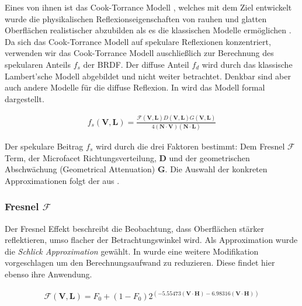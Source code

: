 Eines von ihnen ist das Cook-Torrance Modell \parencite{Cook1981}, welches mit dem Ziel entwickelt wurde die physikalischen Reflexionseigenschaften von rauhen und glatten Oberflächen realistischer abzubilden als es die klassischen Modelle ermöglichen \parencite[Seite 40]{Ngan2004}. Da sich das Cook-Torrance Modell auf spekulare Reflexionen konzentriert, verwenden wir das Cook-Torrance Modell auschließlich zur Berechnung des spekularen Anteils $f_s$ der BRDF. Der diffuse Anteil $f_d$ wird durch das klassische Lambert'sche Modell abgebildet und nicht weiter betrachtet. Denkbar sind aber auch andere Modelle für die diffuse Reflexion. In  wird das Modell formal dargestellt.

\begin{align}
	\label{eq:cook-torrance-model}
	f_s(\mathbf V,\mathbf L) = \frac{\mathcal{F}(\mathbf V,\mathbf L)D(\mathbf V,\mathbf L)G(\mathbf V,\mathbf L)}{4(\mathbf N \cdot \mathbf V)(\mathbf N \cdot \mathbf L)}
\end{align}

Der spekulare Beitrag $f_s$ wird durch die drei Faktoren bestimmt: Dem Fresnel $\mathcal{F}$ Term, der Microfacet Richtungsverteilung, $\mathbf D$ und der geometrischen Abschwächung (Geometrical Attenuation) $\mathbf G$. Die Auswahl der konkreten Approximationen folgt der aus \cite[Seite 3]{Karis2013}.

\subsubsection[Fresnel]{Fresnel $\mathcal{F}$}
Der Fresnel Effekt beschreibt die Beobachtung, dass Oberflächen stärker reflektieren, umso flacher der Betrachtungswinkel wird. Als Approximation wurde die \textit{Schlick Approximation} \parencite{Schlick1994} gewählt. In \cite{Lagarde2012} wurde eine weitere Modifikation vorgeschlagen um den Berechnungsaufwand zu reduzieren. Diese findet hier ebenso ihre Anwendung.

\begin{align}
	\label{eq:fresnel-schlick}
	\mathcal F(\mathbf V,\mathbf L) = F_0  + (1 - F_0) 2^{(-5.55473 (\mathbf V \cdot \mathbf H) - 6.98316 (\mathbf V \cdot \mathbf H))}
\end{align}



